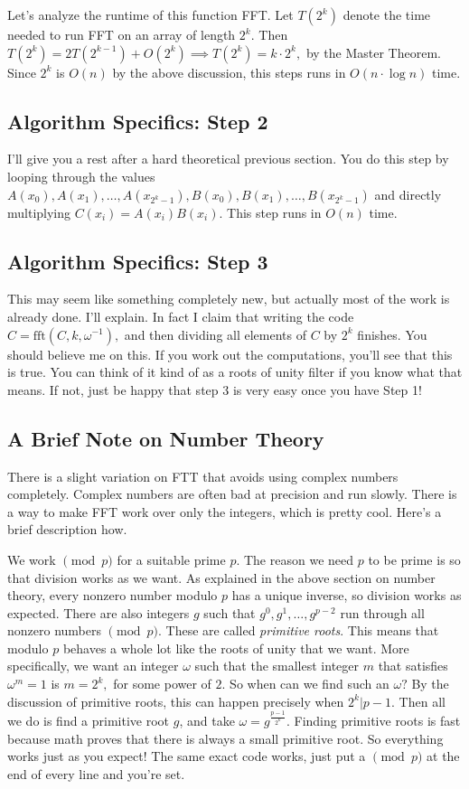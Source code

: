 Let's analyze the runtime of this function FFT. Let $T(2^k)$ denote the time needed to run FFT on an array of length $2^k.$ Then $T(2^k) = 2T(2^{k-1}) + O(2^k) \implies T(2^k) = k \cdot 2^k,$ by the Master Theorem. Since $2^k$ is $O(n)$ by the above discussion, this steps runs in $O(n \cdot \log n)$ time.

\subsection{Algorithm Specifics: Step 2}

I'll give you a rest after a hard theoretical previous section. You do this step by looping through the values $A(x_0), A(x_1), \dots, A(x_{2^k-1}), B(x_0), B(x_1), \dots, B(x_{2^k-1})$ and directly multiplying $C(x_i) = A(x_i)B(x_i).$ This step runs in $O(n)$ time.

\subsection{Algorithm Specifics: Step 3}

This may seem like something completely new, but actually most of the work is already done. I'll explain. In fact I claim that writing the code $C = \text{fft}(C, k, \omega^{-1}),$ and then dividing all elements of $C$ by $2^k$ finishes. You should believe me on this. If you work out the computations, you'll see that this is true. You can think of it kind of as a roots of unity filter if you know what that means. If not, just be happy that step 3 is very easy once you have Step 1!

\subsection{A Brief Note on Number Theory}

There is a slight variation on FTT that avoids using complex numbers completely. Complex numbers are often bad at precision and run slowly. There is a way to make FFT work over only the integers, which is pretty cool. Here's a brief description how.

We work $\pmod{p}$ for a suitable prime $p$. The reason we need $p$ to be prime is so that division works as we want. As explained in the above section on number theory, every nonzero number modulo $p$ has a unique inverse, so division works as expected. There are also integers $g$ such that $g^0, g^1, \dots, g^{p-2}$ run through all nonzero numbers $\pmod{p}.$ These are called \emph{primitive roots}. This means that modulo $p$ behaves a whole lot like the roots of unity that we want. More specifically, we want an integer $\omega$ such that the smallest integer $m$ that satisfies $\omega^m = 1$ is $m = 2^k,$ for some power of $2.$ So when can we find such an $\omega?$ By the discussion of primitive roots, this can happen precisely when $2^k | p-1.$ Then all we do is find a primitive root $g$, and take $\omega = g^{\frac{p-1}{2^k}}.$ Finding primitive roots is fast because math proves that there is always a small primitive root. So everything works just as you expect! The same exact code works, just put a $\pmod{p}$ at the end of every line and you're set.